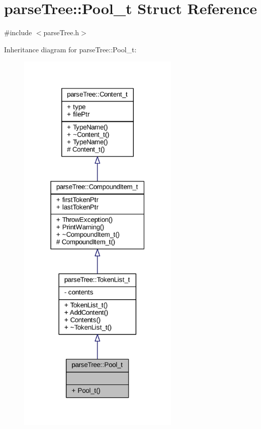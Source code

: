 \hypertarget{structparse_tree_1_1_pool__t}{}\section{parse\+Tree\+:\+:Pool\+\_\+t Struct Reference}
\label{structparse_tree_1_1_pool__t}


{\ttfamily \#include $<$parse\+Tree.\+h$>$}



Inheritance diagram for parse\+Tree\+:\+:Pool\+\_\+t\+:
\nopagebreak
\begin{figure}[H]
\begin{center}
\leavevmode
\includegraphics[width=219pt]{structparse_tree_1_1_pool__t__inherit__graph}
\end{center}
\end{figure}


